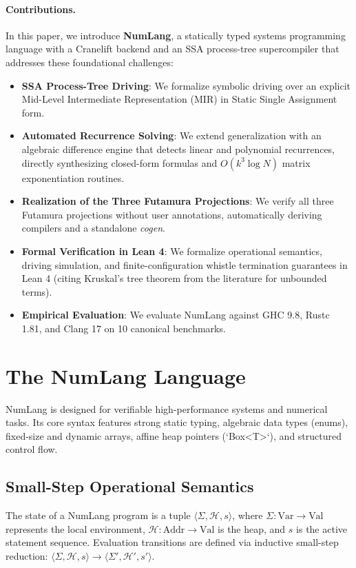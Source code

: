 \documentclass[10pt,twocolumn]{article}
\begin{document}
\paragraph{Contributions.} In this paper, we introduce \textbf{NumLang}, a statically typed systems programming language with a Cranelift backend and an SSA process-tree supercompiler that addresses these foundational challenges:
\begin{itemize}
    \item \textbf{SSA Process-Tree Driving}: We formalize symbolic driving over an explicit Mid-Level Intermediate Representation (MIR) in Static Single Assignment form.
    \item \textbf{Automated Recurrence Solving}: We extend generalization with an algebraic difference engine that detects linear and polynomial recurrences, directly synthesizing closed-form formulas and $O(k^3 \log N)$ matrix exponentiation routines.
    \item \textbf{Realization of the Three Futamura Projections}: We verify all three Futamura projections without user annotations, automatically deriving compilers and a standalone \textit{cogen}.
    \item \textbf{Formal Verification in Lean 4}: We formalize operational semantics, driving simulation, and finite-configuration whistle termination guarantees in Lean 4 (citing Kruskal's tree theorem from the literature for unbounded terms).
    \item \textbf{Empirical Evaluation}: We evaluate NumLang against GHC 9.8, Rustc 1.81, and Clang 17 on 10 canonical benchmarks.
\end{itemize}

\section{The NumLang Language}
NumLang is designed for verifiable high-performance systems and numerical tasks. Its core syntax features strong static typing, algebraic data types (enums), fixed-size and dynamic arrays, affine heap pointers (`Box<T>`), and structured control flow.

\subsection{Small-Step Operational Semantics}
The state of a NumLang program is a tuple $\langle \Sigma, \mathcal{H}, s \rangle$, where $\Sigma: \text{Var} \to \text{Val}$ represents the local environment, $\mathcal{H}: \text{Addr} \to \text{Val}$ is the heap, and $s$ is the active statement sequence. Evaluation transitions are defined via inductive small-step reduction:
$\langle \Sigma, \mathcal{H}, s \rangle \longrightarrow \langle \Sigma', \mathcal{H}', s' \rangle$.
\end{document}
